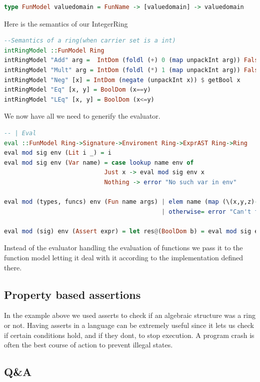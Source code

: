 \documentclass{article}
\begin{document}
        \begin{lstlisting}[language=Haskell]
type FunModel valuedomain = FunName -> [valuedomain] -> valuedomain
        \end{lstlisting}
        Here is the semantics of our IntegerRing
        \begin{lstlisting}[language=Haskell]
--Semantics of a ring(when carrier set is a int)
intRingModel ::FunModel Ring
intRingModel "Add" arg =  IntDom (foldl (+) 0 (map unpackInt arg)) False
intRingModel "Mult" arg = IntDom (foldl (*) 1 (map unpackInt arg)) False
intRingModel "Neg" [x] = IntDom (negate (unpackInt x)) $ getBool x
intRingModel "Eq" [x, y] = BoolDom (x==y)
intRingModel "LEq" [x, y] = BoolDom (x<=y)
        \end{lstlisting}
        We now have all we need to generify the evaluator.
        \begin{lstlisting}[language=Haskell]
-- | Eval
eval ::FunModel Ring->Signature->Enviroment Ring->ExprAST Ring->Ring
eval mod sig env (Lit i _) = i
eval mod sig env (Var name) = case lookup name env of
                            Just x -> eval mod sig env x
                            Nothing -> error "No such var in env"

eval mod (types, funcs) env (Fun name args) | elem name (map (\(x,y,z)->x) funcs) =mod name (map (eval mod (types, funcs) env) args)
                                            | otherwise= error "Can't find function in signature"

eval mod (sig) env (Assert expr) = let res@(BoolDom b) = eval mod sig env expr in if b then res else error $"Assert did not hold"++ (show expr)

        \end{lstlisting}
        Instead of the evaluator handling the evaluation of functions we pass it to the function model letting it deal with it according to the implementation defined there.
        \subsection{Property based assertions}
        In the example above we used asserts to check if an algebraic structure was a ring or not. Having asserts in a language can be extremely useful since it lets us check if certain conditions hold, and if they dont, to stop execution.
        A program crash is often the best course of action to prevent illegal states. 
        \subsection{Q\&A}
\end{document}

